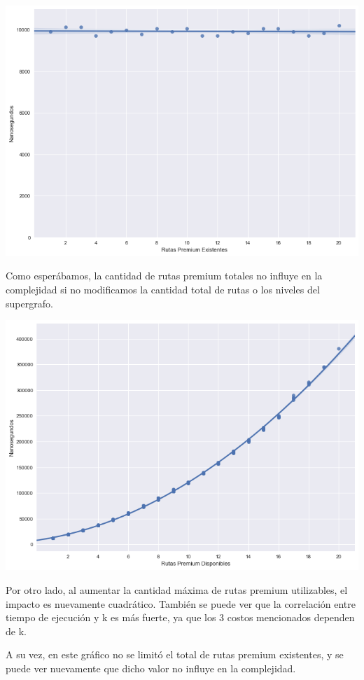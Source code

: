 \begin{center}
	\includegraphics[scale=0.5]{imagenes/ej1-3.png}
\end{center}

Como esperábamos, la cantidad de rutas premium totales no influye en la complejidad si no modificamos la cantidad total de rutas o los niveles del supergrafo.

\begin{center}
	\includegraphics[scale=0.5]{imagenes/ej1-4.png}
\end{center}

Por otro lado, al aumentar la cantidad máxima de rutas premium utilizables, el impacto es nuevamente cuadrático. También se puede ver que la correlación entre tiempo de ejecución y k es más fuerte, ya que los 3 costos mencionados dependen de k.

A su vez, en este gráfico no se limitó el total de rutas premium existentes, y se puede ver nuevamente que dicho valor no influye en la complejidad.


\pagebreak